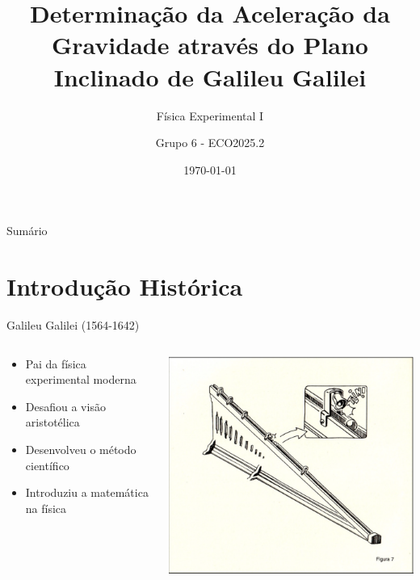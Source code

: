 \documentclass[12pt]{beamer}
\title[Plano Inclinado de Galileu]{Determinação da Aceleração da Gravidade através do Plano Inclinado de Galileu Galilei}
\subtitle{Física Experimental I}
\author{Grupo 6 - ECO2025.2}
\institute{Instituto Federal Catarinense}
\date{\today}
\begin{document}
\begin{frame}
    \titlepage
\end{frame}

\begin{frame}{Sumário}
    \tableofcontents
\end{frame}

\section{Introdução Histórica}

\begin{frame}{Galileu Galilei (1564-1642)}
    \begin{columns}
        \begin{column}{0.6\textwidth}
            \begin{itemize}
                \item Pai da física experimental moderna
                \item Desafiou a visão aristotélica
                \item Desenvolveu o método científico
                \item Introduziu a matemática na física
            \end{itemize}
        \end{column}
        \begin{column}{0.4\textwidth}
            \includegraphics[width=\textwidth]{pictures/GalileuPlano.png}
        \end{column}
    \end{columns}
\end{frame}
\end{document}
